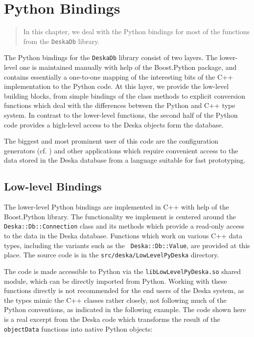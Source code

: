\documentclass[deska]{subfiles}
\begin{document}
\chapter{Python Bindings}
\label{sec:python-bindings}

\begin{abstract}
In this chapter, we deal with the Python bindings for most of the functions from the  {\tt DeskaDb} library.
\end{abstract}

The Python bindings for the {\tt DeskaDb} library consist of two layers.  The lower-level one is maintained
manually with help of the Boost.Python package, and contains essentially a one-to-one mapping of the interesting bits of
the C++ implementation to the Python code.  At this layer, we provide the low-level building blocks, from simple
bindings of the class methods to explicit conversion functions which deal with the differences between the Python and
C++ type system.  In contrast to the lower-level functions, the second half of the Python code provides a high-level
access to the Deska objects form the database.

The biggest and most prominent user of this code are the configuration generators (cf. )
and other applications which require convenient access to the data stored in the Deska database from a language suitable
for fast prototyping.

\section{Low-level Bindings}

The lower-level Python bindings are implemented in C++ with help of the Boost.Python library.  The functionality we
implement is centered around the {\tt Deska::Db::Connection} class and its methods which provide a read-only access to
the data in the Deska database.  Functions which work on various C++ data types, including the variants such as the {\tt
Deska::Db::Value}, are provided at this place.  The source code is in the {\tt src/deska/LowLevelPyDeska} directory.

The code is made accessible to Python via the {\tt libLowLevelPyDeska.so} shared module, which can be directly imported
from Python.  Working with these functions directly is not recommended for the end users of the Deska system, as the
types mimic the C++ classes rather closely, not following much of the Python conventions, as indicated in the following
example.  The code shown here is a real excerpt from the Deska code which transforms the result of the {\tt objectData}
functions into native Python objects:
\end{document}
